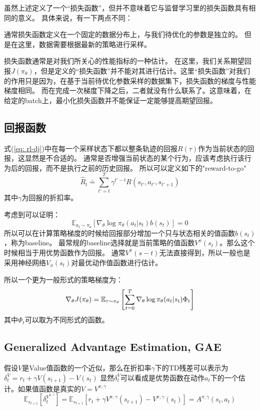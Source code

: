 {} 虽然上述定义了一个“损失函数”，但并不意味着它与监督学习里的损失函数具有相同的意义。
具体来说，有一下两点不同：

 通常损失函数定义在一个固定的数据分布上，与我们待优化的参数是独立的。
但是在这里，数据需要根据最新的策略进行采样。

 损失函数通常是对我们所关心的性能指标的一种估计。
在这里，我们关系期望回报$J(\pi_\theta)$，但是定义的“损失函数”并不能对其进行估计。这里“损失函数”对我们的作用只是因为，在基于当前待优化参数采样的数据集下，损失函数的梯度与性能梯度相同。
而在完成一次梯度下降之后，二者就没有什么联系了。这意味着，在给定的batch上，最小化损失函数并不能保证一定能够提高期望回报。

\subsection{回报函数}
式(\ref{eq: rl-dj})中在每一个采样状态下都以整条轨迹的回报$R(\tau)$作为当前状态的回报，这显然是不合适的。
通常是否增强当前状态的某个行为，应该考虑执行该行为后的回报，而不是执行之前的历史回报。
所以可以定义如下的"reward-to-go"
\begin{equation*}
    \hat{R}_t \doteq \sum_{t'=t}^T \gamma ^ {t'-t}R(s_{t'}, a_{t'}, s_{t'+1})
\end{equation*}
其中$\gamma$为回报的折扣率。

考虑到可以证明：
\begin{equation*}
    \mathbb{E}_{a_t\sim\pi_\theta}[\nabla_\theta \log \pi_\theta(a_t|s_t)b(s_t)] = 0
\end{equation*}
所以可以在计算策略梯度的时候给回报部分增加一个只与状态相关的值函数$b(s_t)$，称为baseline。
最常规的baseline选择就是当前策略的值函数$V^\pi(s_t)$。那么这个时候相当于用优势函数作为回报。
通常$V^\pi(s-t)$无法直接得到，所以一般也是采用神经网络$V_\phi(s_t)$对最优动作值函数进行估计。

所以一个更为一般形式的策略梯度为：
\begin{equation}{\label{eq: general-pg}}
    \nabla_\theta J(\pi_\theta) = \mathbb{E}_{\tau\sim\pi_\theta} \left[ \sum_{t=0}^T \nabla_\theta \log\pi_\theta(a_t|s_t) \Phi_t \right]
\end{equation}
其中$\Phi_t$可以取为不同形式的函数。

\subsection{Generalized Advantage Estimation, GAE}
假设$V$是Value值函数的一个近似，那么在折扣率$\gamma$下的TD残差可以表示为$\delta_t^V = r_t + \gamma V(s_{t+1}) - V(s_t)$
显然$\delta_t^V$可以看成是优势函数在动作$a_t$下的一个估计。如果值函数是真实的$V = V^{\pi,\gamma}$
\begin{equation*}
    \mathbb{E}_{s_{t+1}}[\delta_t^{V^{\pi,\gamma}}] = \mathbb{E}_{s_{t+1}}[r_t + \gamma V^{\pi,\gamma}(s_{t+1}) - V^{\pi,\gamma}(s_t)] = A^{\pi,\gamma}(s_t, a_t)
\end{equation*}


